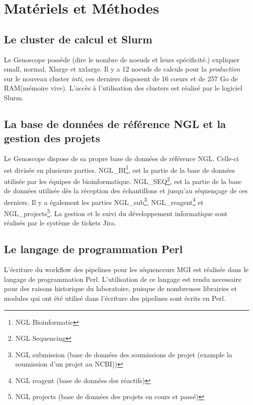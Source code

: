 \section{Matériels et Méthodes}
\subsection{Le cluster de calcul et Slurm}
Le Genoscope possède (dire le nombre de noeuds et leurs spécificité.)
expliquer small, normal, Xlarge et xxlarge.
Il y a 12 noeuds de calculs pour la \emph{production} sur le nouveau cluster \emph{inti}, ces derniers disposent de 16 cœurs et de 257 Go de RAM(mémoire vive). L'accès à l'utilisation des clusters est réalisé par le logiciel Slurm.

\subsection{La base de données de référence NGL et la gestion des projets}
Le Genoscope dispose de sa propre base de données de référence NGL. Celle-ci est divisée en plusieurs parties. NGL\_BI\footnote{NGL Bioinformatic}, est la partie de la base de données utilisée par les équipes de bioinformatique. NGL\_SEQ\footnote{NGL Sequencing}, est la partie de la base de données utilisée dès la réception des échantillons et jusqu'au séquençage de ces derniers. Il y a également les parties NGL\_sub\footnote{NGL submission (base de données des soumissions de projet (example la soumission d'un projet au NCBI))}, NGL\_reagent\footnote{NGL reagent (base de données des réactifs)} et NGL\_projects\footnote{NGL projects (base de données des projets en cours et passé)}. La gestion et le suivi du développement informatique sont réalisés par le système de tickets Jira.

\subsection{Le langage de programmation Perl}
L'écriture du workflow des pipelines pour les séquenceurs MGI est réalisée dans le langage de programmation Perl. L'utilisation de ce langage est rendu necessaire pour des raisons historique du laboratoire, puisque de nombreuses librairies et modules qui ont été utilisé dans l'écriture des pipelines sont écrits en Perl.\\

